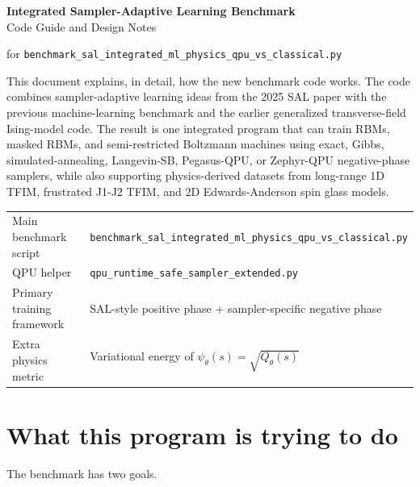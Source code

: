 \documentclass[11pt]{article}
\begin{document}
\begin{titlepage}
\centering
\vspace*{2.2cm}

{\Huge\bfseries Integrated Sampler-Adaptive Learning Benchmark\\[0.4em]}
{\Large Code Guide and Design Notes\\[1.2em]}

{\large for \texttt{benchmark\_sal\_integrated\_ml\_physics\_qpu\_vs\_classical.py}}\\[2.0em]

\begin{minipage}{0.9\textwidth}
\centering
{}
This document explains, in detail, how the new benchmark code works. The code
combines sampler-adaptive learning ideas from the 2025 SAL paper with the
previous machine-learning benchmark and the earlier generalized transverse-field
Ising-model code. The result is one integrated program that can train RBMs,
masked RBMs, and semi-restricted Boltzmann machines using exact, Gibbs,
simulated-annealing, Langevin-SB, Pegasus-QPU, or Zephyr-QPU negative-phase
samplers, while also supporting physics-derived datasets from long-range 1D
TFIM, frustrated J1-J2 TFIM, and 2D Edwards-Anderson spin glass models.
\end{minipage}

\vfill

\begin{tabular}{>{\raggedright\arraybackslash}p{} p{}}
\toprule
Main benchmark script & \texttt{benchmark\_sal\_integrated\_ml\_physics\_qpu\_vs\_classical.py} \\
QPU helper & \texttt{qpu\_runtime\_safe\_sampler\_extended.py} \\
Primary training framework & SAL-style positive phase + sampler-specific negative phase \\
Extra physics metric & Variational energy of $\psi_\theta(s)=\sqrt{Q_\theta(s)}$ \\
\bottomrule
\end{tabular}

\vspace*{1.2cm}
\end{titlepage}

\section{What this program is trying to do}

The benchmark has two goals.
\end{document}
